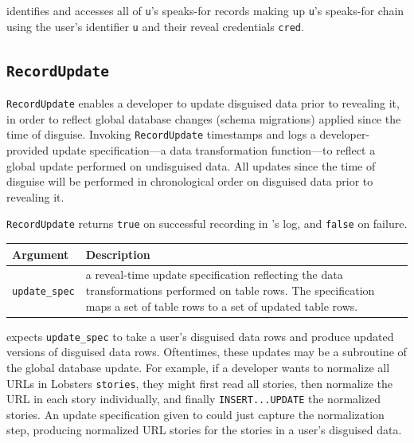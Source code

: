     \sys identifies and accesses all of \texttt{u}'s speaks-for records making
    up \texttt{u}'s speaks-for chain using the user's identifier \texttt{u} and
    their reveal credentials \texttt{cred}.

\subsection{\texttt{RecordUpdate}}
\label{s:semantics:updates}

\texttt{RecordUpdate} enables a developer to update disguised data prior to
revealing it, in order to reflect global database changes (\eg schema migrations)
applied since the time of disguise.
%
Invoking \texttt{RecordUpdate} timestamps and logs a developer-provided update
specification---a data transformation function---to reflect a global update
performed on undisguised data. All updates since the time of disguise will be
performed in chronological order on disguised data prior to revealing it.

\texttt{RecordUpdate} returns \texttt{true} on successful recording in \sys's
    log, and \texttt{false} on failure.

\begin{center}
    \begin{longtable}{|m{}|m{}|}
        \hline
        \textbf{Argument} & \textbf{Description} \\
        \hline
             \texttt{update\_spec}& a reveal-time update specification reflecting
    the data transformations performed on table rows. The specification maps a
    set of table rows to a set of updated table rows.\\
        \hline
    \end{longtable}
    \end{center}
    \vspace{-24pt}

%
    \sys expects \texttt{update\_spec} to take a user's disguised data rows and
    produce updated versions of disguised data rows.
%
    Oftentimes, these updates may be a subroutine of the global database update. 
%
    For example, if a developer wants to normalize all URLs in Lobsters
    \texttt{stories}, they might first read all stories, then normalize the URL
    in each story individually, and finally \texttt{INSERT...UPDATE} the
    normalized stories. 
%
    An update specification given to \sys could just capture the normalization
    step, producing normalized URL stories for the stories in a user's disguised
    data.
%

